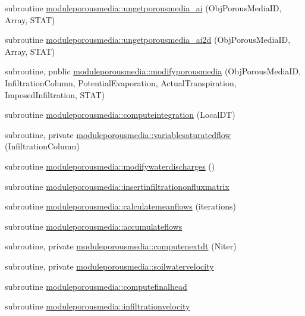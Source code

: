 \begin{DoxyCompactItemize}
\item 
subroutine \mbox{\hyperlink{namespacemoduleporousmedia_ad36e11e27240926924cf03325b9a47bc}{moduleporousmedia\+::ungetporousmedia\+\_\+ai}} (Obj\+Porous\+Media\+ID, Array, S\+T\+AT)
\item 
subroutine \mbox{\hyperlink{namespacemoduleporousmedia_a287c849b30a2dc7af1280cf983edfb8d}{moduleporousmedia\+::ungetporousmedia\+\_\+ai2d}} (Obj\+Porous\+Media\+ID, Array, S\+T\+AT)
\item 
subroutine, public \mbox{\hyperlink{namespacemoduleporousmedia_a382cfd35fca1c040d9c4d2fb68011276}{moduleporousmedia\+::modifyporousmedia}} (Obj\+Porous\+Media\+ID, Infiltration\+Column, Potential\+Evaporation, Actual\+Transpiration, Imposed\+Infiltration, S\+T\+AT)
\item 
subroutine \mbox{\hyperlink{namespacemoduleporousmedia_a7f0fec21916c2f7aad9c56e3af1c8cae}{moduleporousmedia\+::computeintegration}} (Local\+DT)
\item 
subroutine, private \mbox{\hyperlink{namespacemoduleporousmedia_a616ff2e8e3230ac9ca5923369b4d8cfc}{moduleporousmedia\+::variablesaturatedflow}} (Infiltration\+Column)
\item 
subroutine \mbox{\hyperlink{namespacemoduleporousmedia_a1a0af39f7098b5de11c64c15cb6f4c39}{moduleporousmedia\+::modifywaterdischarges}} ()
\item 
subroutine \mbox{\hyperlink{namespacemoduleporousmedia_a981859707e33f26a3f78d09d6f170f12}{moduleporousmedia\+::insertinfiltrationonfluxmatrix}}
\item 
subroutine \mbox{\hyperlink{namespacemoduleporousmedia_a25f85d61b730aa85aca7f9dded8b38b5}{moduleporousmedia\+::calculatemeanflows}} (iterations)
\item 
subroutine \mbox{\hyperlink{namespacemoduleporousmedia_a96f689b9636ed899f8e42b8e37d1e63d}{moduleporousmedia\+::accumulateflows}}
\item 
subroutine, private \mbox{\hyperlink{namespacemoduleporousmedia_ae1f8e4af55c2c1a3cad5db62a53c9041}{moduleporousmedia\+::computenextdt}} (Niter)
\item 
subroutine, private \mbox{\hyperlink{namespacemoduleporousmedia_a717a5b2d4249d602f98474f7a4c24665}{moduleporousmedia\+::soilwatervelocity}}
\item 
subroutine \mbox{\hyperlink{namespacemoduleporousmedia_ab6c499954f98c7268ff499c927952622}{moduleporousmedia\+::computefinalhead}}
\item 
subroutine \mbox{\hyperlink{namespacemoduleporousmedia_a42b31332e78c6e4efb8f6b4c8c1bc569}{moduleporousmedia\+::infiltrationvelocity}}

\end{DoxyCompactItemize}

